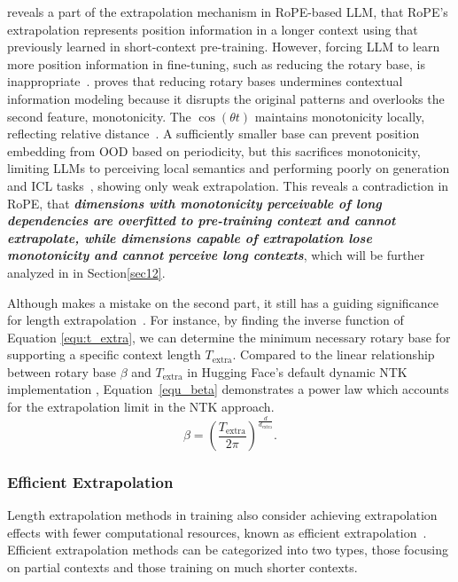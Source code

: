\citet{liuscaling} reveals a part of the extrapolation mechanism in RoPE-based LLM, that RoPE's extrapolation represents position information in a longer context using that previously learned in short-context pre-training. However, forcing LLM to learn more position information in fine-tuning, such as reducing the rotary base, is inappropriate~\citep{men2024base}. \citet{men2024base} proves that reducing rotary bases undermines contextual information modeling because it disrupts the original patterns and overlooks the second feature, monotonicity. The $\cos(\theta t)$ maintains monotonicity locally, reflecting relative distance~\citep{wei2025videorope}. A sufficiently smaller base can prevent position embedding from OOD based on periodicity, but this sacrifices monotonicity, limiting LLMs to perceiving local semantics and performing poorly on generation and ICL tasks~\citep{liuscaling, men2024base}, showing only weak extrapolation. This reveals a contradiction in RoPE, that \textit{\textbf{dimensions with monotonicity perceivable of long dependencies are overfitted to pre-training context and cannot extrapolate, while dimensions capable of extrapolation lose monotonicity and cannot perceive long contexts}}, which will be further analyzed in \textbf{} in Section\ref{sec12}.

Although \citet{liuscaling} makes a mistake on the second part, it still has a guiding significance for length extrapolation~\citep{cai2024internlm2,Apple2024AppleIntelligence}. For instance, by finding the inverse function of Equation \ref{equ:t_extra}, we can determine the minimum necessary rotary base for supporting a specific context length $T_\text{extra}$. Compared to the linear relationship between rotary base $\beta$ and $T_\text{extra}$ in Hugging Face's default dynamic NTK implementation
, Equation~\ref{equ_beta} demonstrates a power law which accounts for the extrapolation limit in the NTK approach.
\begin{equation}
    \beta =\left(\frac{T_\text{extra}}{2\pi}\right)^{\frac{d}{d_\text{extra}}}\text{.}
\label{equ_beta}\end{equation}

\subsubsection{Efficient Extrapolation}
Length extrapolation methods in training also consider achieving extrapolation effects with fewer computational resources, known as efficient extrapolation~\citep{chen2023extending, pengyarn}.  Efficient extrapolation methods can be categorized into two types, those focusing on partial contexts and those training on much shorter contexts.

